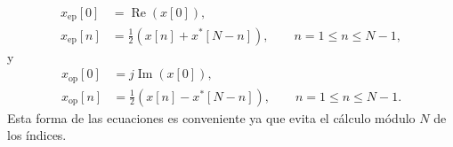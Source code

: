 \documentclass[a4paper]{report}
\renewcommand{\Re}{\operatorname{Re}}
\renewcommand{\Im}{\operatorname{Im}}
\begin{document}
\begin{equation}\label{eq:dft_properties_symmetry_xep}
 \begin{aligned}
  x_\textrm{ep}[0]&=\Re(x[0]),\\
  x_\textrm{ep}[n]&=\frac{1}{2}(x[n]+x^*[N-n]),\qquad n=1\leq n\leq N-1,
 \end{aligned}
\end{equation}
y
\begin{equation}\label{eq:dft_properties_symmetry_xop}
 \begin{aligned}
  x_\textrm{op}[0]&=j\Im(x[0]),\\
  x_\textrm{op}[n]&=\frac{1}{2}(x[n]-x^*[N-n]),\qquad n=1\leq n\leq N-1.
 \end{aligned}
\end{equation}
Esta forma de las ecuaciones es conveniente ya que evita el cálculo módulo \(N\) de los índices.
\end{document}

